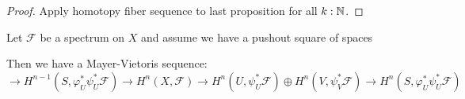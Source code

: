 \begin{proof}
  Apply homotopy fiber sequence to last proposition for all $k:\mathbb{N}$.
\end{proof}

\begin{lemma}
  \label{mayer-vietoris-sequence}
  Let $\mathcal F$ be a spectrum on $X$ and assume we have a pushout square of spaces
  \begin{center}
  \end{center}
  Then we have a Mayer-Vietoris sequence:
    \[ \to H^{n-1}(S,\varphi_U^*\psi_U^* \mathcal F) \to H^n(X,\mathcal F) \to H^n(U,\psi_U^*\mathcal F)\oplus H^n(V,\psi_V^*\mathcal F) \to H^n(S,\varphi_U^*\psi_U^*\mathcal F) \]
\end{lemma}
 
